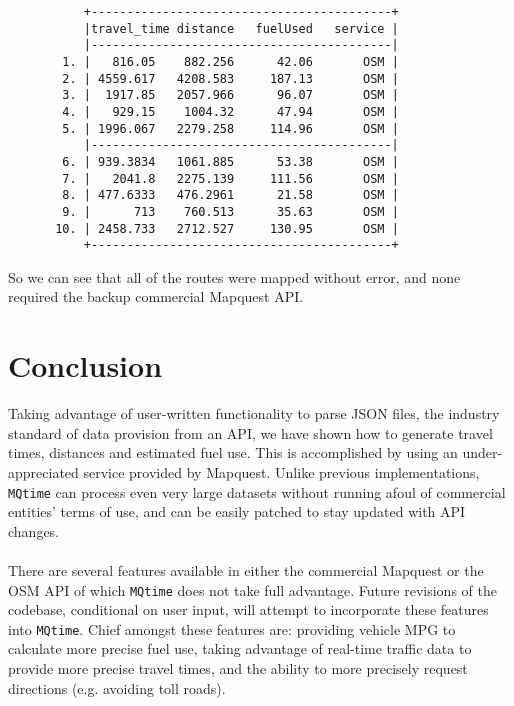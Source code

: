\documentclass[12pt]{article}
\begin{document}
\begin{figure}[htbp]
\begin{center}
{\footnotesize
\begin{verbatim}
     +------------------------------------------+
     |travel_time distance   fuelUsed   service |
     |------------------------------------------|
  1. |   816.05    882.256      42.06       OSM |
  2. | 4559.617   4208.583     187.13       OSM |
  3. |  1917.85   2057.966      96.07       OSM |
  4. |   929.15    1004.32      47.94       OSM |
  5. | 1996.067   2279.258     114.96       OSM |
     |------------------------------------------|
  6. | 939.3834   1061.885      53.38       OSM |
  7. |   2041.8   2275.139     111.56       OSM |
  8. | 477.6333   476.2961      21.58       OSM |
  9. |      713    760.513      35.63       OSM |
 10. | 2458.733   2712.527     130.95       OSM |
     +------------------------------------------+
\end{verbatim}
}
\end{center}
\end{figure}
So we can see that all of the routes were mapped without error, and none required the backup commercial Mapquest API.

\section{Conclusion}
Taking advantage of user-written functionality to parse JSON files, the industry standard of data provision from an API, we have shown how to generate travel times, distances and estimated fuel use. This is accomplished by using an under-appreciated service provided by Mapquest. Unlike previous implementations, \verb|MQtime| can process even very large datasets without running afoul of commercial entities' terms of use, and can be easily patched to stay updated with API changes. 
\\ \\
There are several features available in either the commercial Mapquest or the OSM API of which \verb|MQtime| does not take full advantage. Future revisions of the codebase, conditional on user input, will attempt to incorporate these features into \verb|MQtime|. Chief amongst these features are: providing vehicle MPG to calculate more precise fuel use, taking advantage of real-time traffic data to provide more precise travel times, and the ability to more precisely request directions (e.g. avoiding toll roads).
\end{document}
